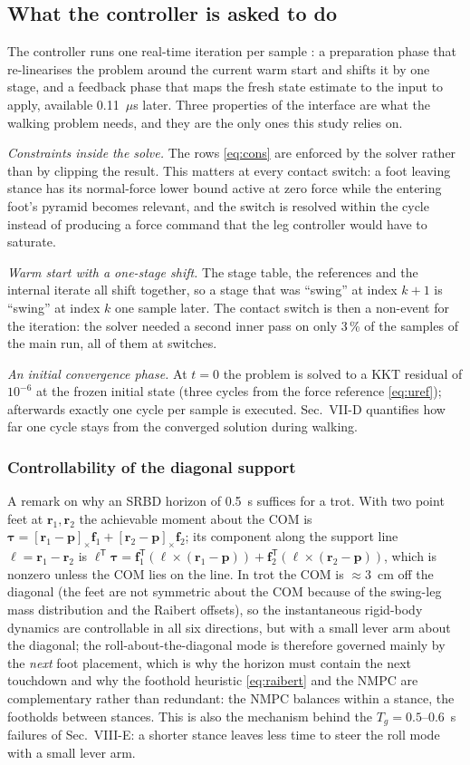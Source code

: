 \documentclass[11pt]{article}
\newcommand{\T}{^{\mathsf T}}
\newcommand{\bp}{\bm{p}}\newcommand{\bv}{\bm{v}}\newcommand{\bom}{\bm{\omega}}\newcommand{\bth}{\bm{\theta}}
\newcommand{\bfv}{\bm{f}}\newcommand{\br}{\bm{r}}\newcommand{\bd}{\bm{d}}\newcommand{\bs}{\bm{s}}
\newcommand{\sk}[1]{\left[#1\right]_\times}
\begin{document}
\subsection{What the controller is asked to do}
The controller runs one real-time iteration per sample \cite{diehl2005}: a preparation phase that re-linearises the problem around the current warm start and shifts it by one stage, and a feedback phase that maps the fresh state estimate to the input to apply, available 0.11~$\mu$s later. Three properties of the interface are what the walking problem needs, and they are the only ones this study relies on.

\emph{Constraints inside the solve.} The rows \eqref{eq:cons} are enforced by the solver rather than by clipping the result. This matters at every contact switch: a foot leaving stance has its normal-force lower bound active at zero force while the entering foot's pyramid becomes relevant, and the switch is resolved within the cycle instead of producing a force command that the leg controller would have to saturate.

\emph{Warm start with a one-stage shift.} The stage table, the references and the internal iterate all shift together, so a stage that was ``swing'' at index $k+1$ is ``swing'' at index $k$ one sample later. The contact switch is then a non-event for the iteration: the solver needed a second inner pass on only 3\,\% of the samples of the main run, all of them at switches.

\emph{An initial convergence phase.} At $t=0$ the problem is solved to a KKT residual of $10^{-6}$ at the frozen initial state (three cycles from the force reference \eqref{eq:uref}); afterwards exactly one cycle per sample is executed. Sec.~VII-D quantifies how far one cycle stays from the converged solution during walking.

\subsubsection{Controllability of the diagonal support}
A remark on why an SRBD horizon of 0.5~s suffices for a trot. With two point feet at $\br_1,\br_2$ the achievable moment about the COM is $\bm\tau=\sk{\br_1-\bp}\bfv_1+\sk{\br_2-\bp}\bfv_2$; its component along the support line $\bm\ell=\br_1-\br_2$ is $\bm\ell\T\bm\tau=\bfv_1\T(\bm\ell\times(\br_1-\bp))+\bfv_2\T(\bm\ell\times(\br_2-\bp))$, which is nonzero unless the COM lies on the line. In trot the COM is $\approx3$~cm off the diagonal (the feet are not symmetric about the COM because of the swing-leg mass distribution and the Raibert offsets), so the instantaneous rigid-body dynamics are controllable in all six directions, but with a small lever arm about the diagonal; the roll-about-the-diagonal mode is therefore governed mainly by the \emph{next} foot placement, which is why the horizon must contain the next touchdown and why the foothold heuristic \eqref{eq:raibert} and the NMPC are complementary rather than redundant: the NMPC balances within a stance, the footholds between stances. This is also the mechanism behind the $T_g=0.5$--$0.6$~s failures of Sec.~VIII-E: a shorter stance leaves less time to steer the roll mode with a small lever arm.
\end{document}
